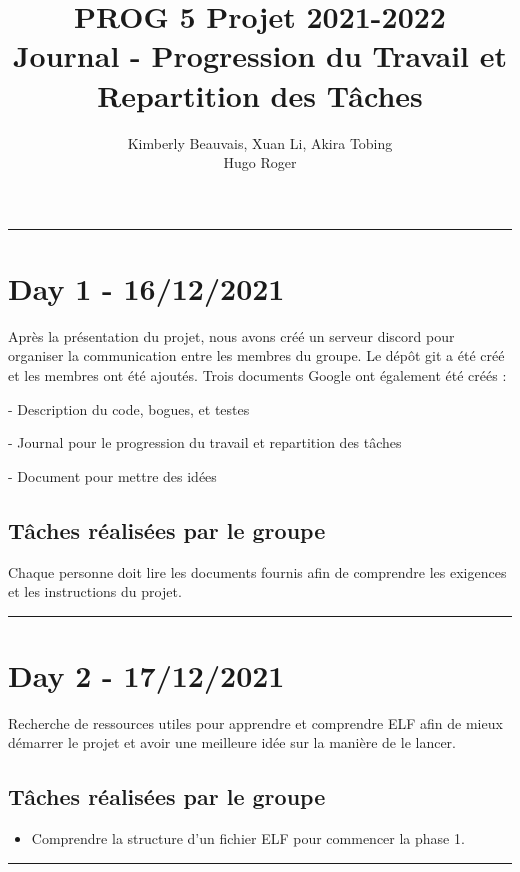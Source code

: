 \documentclass[11pt,letterpaper]{article}
\title{PROG 5 Projet 2021-2022 \\
\large Journal - Progression du Travail et Repartition des Tâches}
\author{Kimberly Beauvais, Xuan Li, Akira Tobing \\
Hugo Roger}
\date{}
\begin{document}
\maketitle

\noindent\rule{13cm}{0.4pt}

\section*{Day 1 - 16/12/2021}

Après la présentation du projet, nous avons créé un serveur discord pour organiser 
la communication entre les membres du groupe. Le dépôt git a été créé et les membres 
ont été ajoutés. Trois documents Google ont également été créés :

\indent - Description du code, bogues, et testes

\indent - Journal pour le progression du travail et repartition des tâches

\indent - Document pour mettre des idées

\subsection*{Tâches réalisées par le groupe}
Chaque personne doit lire les documents fournis afin de comprendre les exigences et 
les instructions du projet. 

\noindent\rule{13cm}{0.4pt}

\section*{Day 2 - 17/12/2021}
Recherche de ressources utiles pour apprendre et comprendre ELF afin de mieux 
démarrer le projet et avoir une meilleure idée sur la manière de le lancer.

\subsection*{Tâches réalisées par le groupe}
\begin{itemize}
    \item Comprendre la structure d'un fichier ELF pour commencer la phase 1.
\end{itemize}

\noindent\rule{13cm}{0.4pt}

\end{document}
